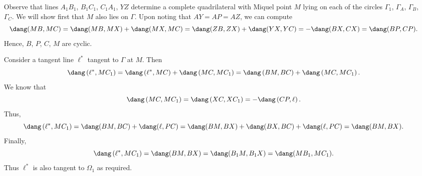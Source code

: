 Observe that lines $A_1B_1$, $B_1C_1$, $C_1A_1$, $YZ$
determine a complete quadrilateral with Miquel point $M$ lying
on each of the circles $\Gamma_1$, $\Gamma_A$, $\Gamma_B$, $\Gamma_C$.
We will show first that $M$ also lies on $\Gamma$.
Upon noting that $AY = AP = AZ$, we can compute
\[
  \dang (MB, MC)
  = \dang (MB, MX) + \dang (MX, MC)
  = \dang (ZB, ZX) + \dang (YX, YC)
  = -\dang (BX, CX)
  = \dang (BP, CP). \]
Hence, $B$, $P$, $C$, $M$ are cyclic.

Consider a tangent line $\ell^\ast$ tangent to $\Gamma$ at $M$.
Then
\[
  \dang \left( \ell^\ast, MC_1 \right)
  = \dang \left( \ell^\ast, MC \right) + \dang \left( MC, MC_1 \right)
  = \dang \left( BM, BC \right) + \dang \left( MC, MC_1 \right)
  . \]
We know that
\[ \dang \left( MC, MC_1 \right)
  = \dang \left( XC, XC_1 \right)
  = -\dang \left( CP, \ell \right). \]
Thus,
\[ \dang \left( \ell^\ast, MC_1 \right)
  =  \dang (BM, BC) + \dang (\ell, PC)
  = \dang (BM, BX) + \dang (BX, BC) + \dang (\ell, PC)
  = \dang (BM, BX).
  \]
Finally,
\[ \dang \left( \ell^\ast, MC_1 \right) = \dang (BM, BX) = \dang (B_1M, B_1X) = \dang (MB_1, MC_1). \]
Thus $\ell^\ast$ is also tangent to $\Omega_1$ as required.
